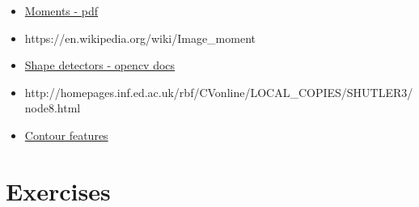 \documentclass[]{article}
\providecommand{\tightlist}{%
  \setlength{\itemsep}{0pt}\setlength{\parskip}{0pt}}
\begin{document}
\begin{itemize}
\tightlist
\item
  \href{http://breckon.eu/toby/teaching/dip/opencv/SimpleImageAnalysisbyMoments.pdf}{Moments - pdf}
\item
  https://en.wikipedia.org/wiki/Image\_moment
\item
  \href{http://docs.opencv.org/modules/imgproc/doc/structural\_analysis\_and
  \_shape\_descriptors.html}{Shape detectors - opencv docs}
\item
  http://homepages.inf.ed.ac.uk/rbf/CVonline/LOCAL\_COPIES/SHUTLER3/node8.html
\item
  \href{http://opencv-python-tutroals.readthedocs.org/en/latest/py\_tutorials/py\_imgproc
  /py\_contours/py\_contour\_features/py\_contour\_features.html\#contour-features}{Contour features}
\end{itemize}

\section{Exercises}\label{exercises}
\end{document}
